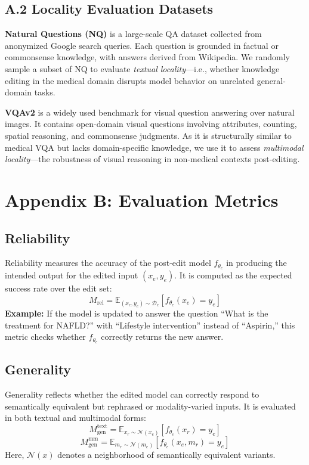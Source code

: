\documentclass[letterpaper]{article} %
\begin{document}
\subsection{A.2 Locality Evaluation Datasets}
\textbf{Natural Questions (NQ)} is a large-scale QA dataset collected from anonymized Google search queries. Each question is grounded in factual or commonsense knowledge, with answers derived from Wikipedia. We randomly sample a subset of NQ to evaluate \textit{textual locality}—i.e., whether knowledge editing in the medical domain disrupts model behavior on unrelated general-domain tasks.

\noindent\textbf{VQAv2} is a widely used benchmark for visual question answering over natural images. It contains open-domain visual questions involving attributes, counting, spatial reasoning, and commonsense judgments. As it is structurally similar to medical VQA but lacks domain-specific knowledge, we use it to assess \textit{multimodal locality}—the robustness of visual reasoning in non-medical contexts post-editing.





\section{Appendix B: Evaluation Metrics}



\subsection{Reliability}
Reliability measures the accuracy of the post-edit model $f_{\theta_e}$ in producing the intended output for the edited input $(x_e, y_e)$. It is computed as the expected success rate over the edit set:
\begin{equation}
M_{\text{rel}} = \mathbb{E}_{(x_e, y_e) \sim \mathcal{D}_e} \left[ f_{\theta_e}(x_e) = y_e \right]
\end{equation}
\textbf{Example:} If the model is updated to answer the question “What is the treatment for NAFLD?” with “Lifestyle intervention” instead of “Aspirin,” this metric checks whether $f_{\theta_e}$ correctly returns the new answer.



\subsection{Generality}
Generality reflects whether the edited model can correctly respond to semantically equivalent but rephrased or modality-varied inputs. It is evaluated in both textual and multimodal forms:
\begin{equation}
M_{\text{gen}}^{\text{text}} = \mathbb{E}_{x_r \sim \mathcal{N}(x_e)} \left[ f_{\theta_e}(x_r) = y_e \right]
\end{equation}
\begin{equation}
M_{\text{gen}}^{\text{mm}} = \mathbb{E}_{m_r \sim \mathcal{N}(m_e)} \left[ f_{\theta_e}(x_e, m_r) = y_e \right]
\end{equation}
Here, $\mathcal{N}(x)$ denotes a neighborhood of semantically equivalent variants.
\end{document}
